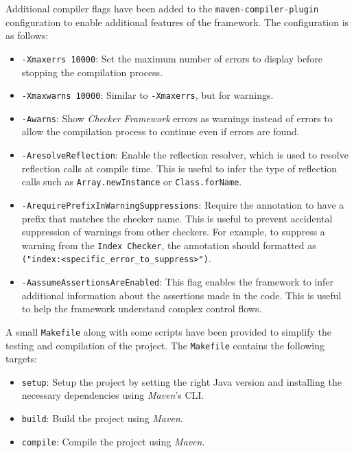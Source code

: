 \documentclass[a4paper, 11pt]{article}
\begin{document}
Additional compiler flags have been added to the \texttt{maven-compiler-plugin} configuration to enable additional features of the framework. The configuration is as follows:

\begin{itemize}
    \item \texttt{-Xmaxerrs 10000}: Set the maximum number of errors to display before stopping the compilation process.

    \item \texttt{-Xmaxwarns 10000}: Similar to \texttt{-Xmaxerrs}, but for warnings.

    \item \texttt{-Awarns}: Show \textit{Checker Framework} errors as warnings instead of errors to allow the compilation process to continue even if errors are found.

    \item \texttt{-AresolveReflection}: Enable the reflection resolver, which is used to resolve reflection calls at compile time. This is useful to infer the type of reflection calls such as \texttt{Array.newInstance} or \texttt{Class.forName}.

    \item \texttt{-ArequirePrefixInWarningSuppressions}: Require the \texttt{\@SuppressWarnings} annotation to have a prefix that matches the checker name. This is useful to prevent accidental suppression of warnings from other checkers. For example, to suppress a warning from the \texttt{Index Checker}, the annotation should formatted as \texttt{\@SuppressWarnings("index:<specific\_error\_to\_suppress>")}.

    \item \texttt{-AassumeAssertionsAreEnabled}: This flag enables the framework to infer additional information about the assertions made in the code. This is useful to help the framework understand complex control flows.
\end{itemize}

A small \texttt{Makefile} along with some scripts have been provided to simplify the testing and compilation of the project. The \texttt{Makefile} contains the following targets:

\begin{itemize}
    \item \texttt{setup}: Setup the project by setting the right Java version and installing the necessary dependencies using \textit{Maven}'s CLI.

    \item \texttt{build}: Build the project using \textit{Maven}.

    \item \texttt{compile}: Compile the project using \textit{Maven}.
\end{itemize}
\end{document}
